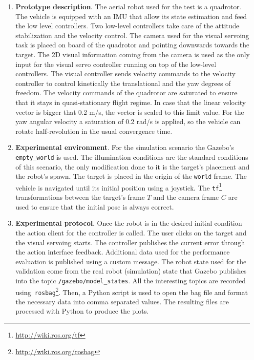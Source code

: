\begin{enumerate}
	\item \textbf{Prototype description}. The aerial robot used for the test is a quadrotor. The vehicle is equipped with an IMU that allow its state estimation and feed the low level controllers. Two low-level controllers take care of the attitude stabilization and the velocity control. The camera used for the visual servoing task is placed on board of the quadrotor and pointing downwards towards the target. The 2D visual information coming from the camera is used as the only input for the visual servo controller running on top of the low-level controllers. The visual controller sends velocity commands to the velocity controller to control kinetically the translational and the yaw degrees of freedom. The velocity commands of the quadrotor are saturated to ensure that it stays in quasi-stationary flight regime. In case that the linear velocity vector is bigger that 0.2 m/s, the vector is scaled to this limit value. For the yaw angular velocity a saturation of 0.2 rad/s is applied, so the vehicle can rotate half-revolution in the usual convergence time.
	
	\item \textbf{Experimental environment}. For the simulation scenario the Gazebo's \texttt{empty\_world} is used. The illumination conditions are the standard conditions of this scenario, the only modification done to it is the target's placement and the robot's spawn. The target is placed in the origin of the \texttt{world} frame. The vehicle is navigated until its initial position using a joystick. The \texttt{tf}\footnote{\url{http://wiki.ros.org/tf}} transformations between the target's frame $T$ and the camera frame $C$ are used to ensure that the initial pose is always correct.
	
	\item \textbf{Experimental protocol}. Once the robot is in the desired initial condition the action client for the controller is called. The user clicks on the target and the visual servoing starts. The controller publishes the current error through the action interface feedback. Additional data used for the performance evaluation is published using a custom message. The robot state used for the validation come from the real robot (simulation) state that Gazebo publishes into the topic \texttt{/gazebo/model\_states}. All the interesting topics are recorded using\texttt{ rosbag}\footnote{\url{http://wiki.ros.org/rosbag}}. Then, a Python script is used to open the bag file and format the necessary data into comma separated values. The resulting files are processed with Python to produce the plots.
	

\end{enumerate}
